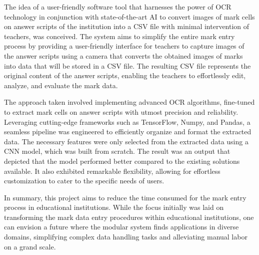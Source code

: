 \vspace{3mm}

\noindent The idea of a user-friendly software tool that harnesses the power of OCR technology in conjunction with state-of-the-art AI to convert images of mark cells on answer scripts of the institution into a CSV file with minimal intervention of teachers, was conceived. The system aims to simplify the entire mark entry process by providing a user-friendly interface for teachers to capture images of the answer scripts using a camera that converts the obtained images of marks into data that will be stored in a CSV file. The resulting CSV file represents the original content of the answer scripts, enabling the teachers to effortlessly edit, analyze, and evaluate the mark data.

\vspace{3mm}

\noindent The approach taken involved implementing advanced OCR algorithms, fine-tuned to extract mark cells on answer scripts with utmost precision and reliability. Leveraging cutting-edge frameworks such as TensorFlow, Numpy, and Pandas, a seamless pipeline was engineered to efficiently organize and format the extracted data. The necessary features were only selected from the extracted data using a CNN model, which was built from scratch. The result was an output that depicted that the model performed better compared to the existing solutions available. It also exhibited remarkable flexibility, allowing for effortless customization to cater to the specific needs of users.

\vspace{3mm}

\noindent In summary, this project aims to reduce the time consumed for the mark entry process in educational institutions. While the focus initially was laid on transforming the mark data entry procedures within educational institutions, one can envision a future where the modular system finds applications in diverse domains, simplifying complex data handling tasks and alleviating manual labor on a grand scale.




\tableofcontents
\printnomenclature
\listoffigures
\listoftables
\clearpage


